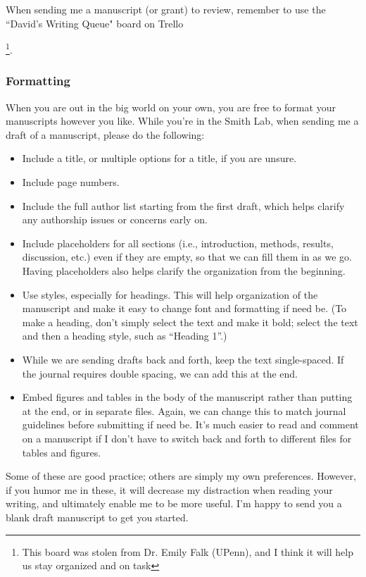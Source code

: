 \documentclass[letterpaper,12pt,oneside]{memoir}
\begin{document}
When sending me a manuscript (or grant) to review, remember to use the ``David's Writing Queue" board on Trello{\footnote{This board was stolen from Dr. Emily Falk (UPenn), and I think it will help us stay organized and on task}.

\subsubsection{Formatting}

When you are out in the big world on your own, you are free to format your manuscripts however you like. While you're in the Smith Lab, when sending me a draft of a manuscript, please do the following:

\begin{itemize}
\item Include a title, or multiple options for a title, if you are unsure. 
\item Include page numbers.
\item Include the full author list starting from the first draft, which helps clarify any authorship issues or concerns early on.
\item Include placeholders for all sections (i.e., introduction, methods, results, discussion, etc.) even if they are empty, so that we can fill them in as we go. Having placeholders also helps clarify the organization from the beginning.
\item Use styles, especially for headings. This will help organization of the manuscript and make it easy to change font and formatting if need be. (To make a heading, don't simply select the text and make it bold; select the text and then a heading style, such as ``Heading 1''.)
\item While we are sending drafts back and forth, keep the text single-spaced. If the journal requires double spacing, we can add this at the end.
\item Embed figures and tables in the body of the manuscript rather than putting at the end, or in separate files. Again, we can change this to match journal guidelines before submitting if need be. It's much easier to read and comment on a manuscript if I don't have to switch back and forth to different files for tables and figures.
\end{itemize}

Some of these are good practice; others are simply my own preferences. However, if you humor me in these, it will decrease my distraction when reading your writing, and ultimately enable me to be more useful. I'm happy to send you a blank draft manuscript to get you started.

}
\end{document}
